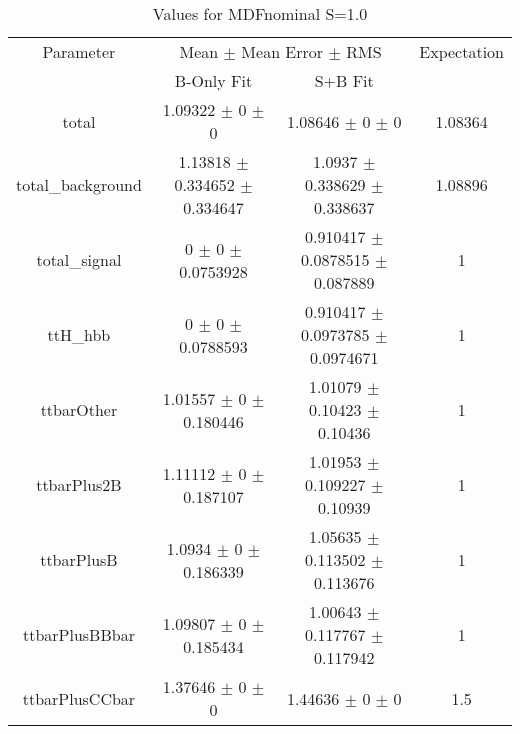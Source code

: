 \begin{table}
\centering
\caption{Values for MDFnominal S=1.0}
\begin{tabular}{cccc}
\toprule
Parameter & \multicolumn{2}{c}{Mean $\pm$ Mean Error $\pm$ RMS} & Expectation\\
 & B-Only Fit & S+B Fit & \\
\midrule
total & \num{1.09322} $\pm$ \num{0} $\pm$ \num{0} & \num{1.08646} $\pm$ \num{0} $\pm$ \num{0} & \num{1.08364}\\
total\_background & \num{1.13818} $\pm$ \num{0.334652} $\pm$ \num{0.334647} & \num{1.0937} $\pm$ \num{0.338629} $\pm$ \num{0.338637} & \num{1.08896}\\
total\_signal & \num{0} $\pm$ \num{0} $\pm$ \num{0.0753928} & \num{0.910417} $\pm$ \num{0.0878515} $\pm$ \num{0.087889} & \num{1}\\
ttH\_hbb & \num{0} $\pm$ \num{0} $\pm$ \num{0.0788593} & \num{0.910417} $\pm$ \num{0.0973785} $\pm$ \num{0.0974671} & \num{1}\\
ttbarOther & \num{1.01557} $\pm$ \num{0} $\pm$ \num{0.180446} & \num{1.01079} $\pm$ \num{0.10423} $\pm$ \num{0.10436} & \num{1}\\
ttbarPlus2B & \num{1.11112} $\pm$ \num{0} $\pm$ \num{0.187107} & \num{1.01953} $\pm$ \num{0.109227} $\pm$ \num{0.10939} & \num{1}\\
ttbarPlusB & \num{1.0934} $\pm$ \num{0} $\pm$ \num{0.186339} & \num{1.05635} $\pm$ \num{0.113502} $\pm$ \num{0.113676} & \num{1}\\
ttbarPlusBBbar & \num{1.09807} $\pm$ \num{0} $\pm$ \num{0.185434} & \num{1.00643} $\pm$ \num{0.117767} $\pm$ \num{0.117942} & \num{1}\\
ttbarPlusCCbar & \num{1.37646} $\pm$ \num{0} $\pm$ \num{0} & \num{1.44636} $\pm$ \num{0} $\pm$ \num{0} & \num{1.5}\\
\bottomrule
\end{tabular}
\end{table}